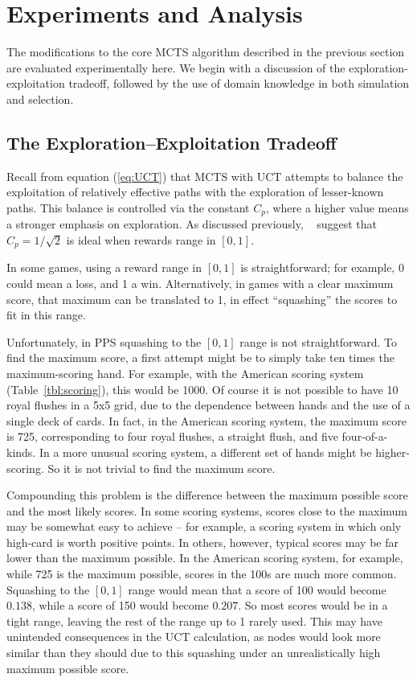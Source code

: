 \documentclass[letterpaper]{article}
\begin{document}
\section{Experiments and Analysis}

The modifications to the core MCTS algorithm described in the previous section are evaluated experimentally here. We begin with a discussion of the exploration-exploitation tradeoff, followed by the use of domain knowledge in both simulation and selection.

\subsection{The Exploration--Exploitation Tradeoff}
Recall from equation (\ref{eq:UCT}) that MCTS with UCT attempts to balance the exploitation of relatively effective paths with the exploration of lesser-known paths. This balance is controlled via the constant $C_p$, where a higher value means a stronger emphasis on exploration. As discussed previously, ~\cite{kocsis2006improved} suggest that $C_p = 1 / \sqrt{2}$ is ideal when rewards range in $[0,1]$. 

In some games, using a reward range in $[0,1]$ is straightforward; for example, 0 could mean a loss, and 1 a win. Alternatively, in games with a clear maximum score, that maximum can be translated to 1, in effect ``squashing'' the scores to fit in this range.

Unfortunately, in PPS squashing to the $[0,1]$ range is not straightforward. To find the maximum score, a first attempt might be to simply take ten times the maximum-scoring hand. For example, with the American scoring system (Table~\ref{tbl:scoring}), this would be 1000. Of course it is not possible to have 10 royal flushes in a 5x5 grid, due to the dependence between hands and the use of a single deck of cards. In fact, in the American scoring system, the maximum score is 725, corresponding to four royal flushes, a straight flush, and five four-of-a-kinds. In a more unusual scoring system, a different set of hands might be higher-scoring. So it is not trivial to find the maximum score.

Compounding this problem is the difference between the maximum possible score and the most likely scores. In some scoring systems, scores close to the maximum may be somewhat easy to achieve -- for example, a scoring system in which only high-card is worth positive points. In others, however, typical scores may be far lower than the maximum possible. In the American scoring system, for example, while 725 is the maximum possible, scores in the 100s are much more common. Squashing to the $[0,1]$ range would mean that a score of 100 would become $0.138$, while a score of 150 would become $0.207$. So most scores would be in a tight range, leaving the rest of the range up to 1 rarely used. This may have unintended consequences in the UCT calculation, as nodes would look more similar than they should due to this squashing under an unrealistically high maximum possible score.
\end{document}
